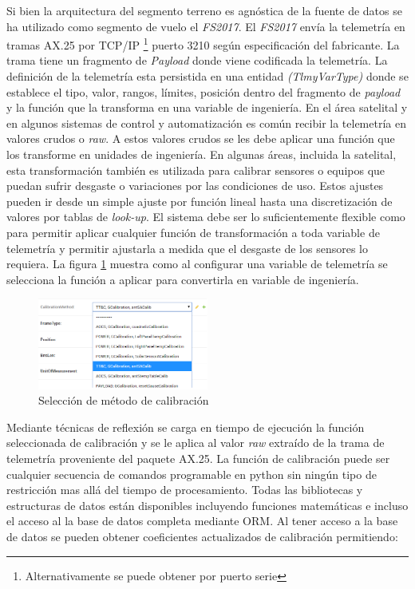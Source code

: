 \documentclass[twoside,twocolumn]{article}
\begin{document}
Si bien la  arquitectura del segmento terreno es agnóstica de la fuente de datos se ha utilizado como segmento de vuelo el \textit{FS2017}. El \textit{FS2017} envía la telemetría en tramas AX.25 por 
TCP/IP \footnote{Alternativamente se puede obtener por puerto serie} puerto 3210 
según especificación del fabricante. La trama tiene un fragmento de 
\textit{Payload} donde viene codificada la telemetría. La definición de la 
telemetría esta persistida en una entidad \textit{(TlmyVarType)} donde se establece 
el tipo, valor, rangos, límites, posición dentro del fragmento de \textit{payload} y la función que 
la transforma en una variable de ingeniería. En el área satelital y en algunos 
sistemas de control y automatización es común recibir la telemetría en valores 
crudos o \textit{raw}. A estos valores crudos se les debe aplicar una función 
que los transforme en unidades de ingeniería. En algunas áreas, incluida la 
satelital,  esta transformación también es utilizada para calibrar sensores o 
equipos que puedan sufrir desgaste o variaciones por las condiciones de uso. 
Estos ajustes pueden ir desde un simple ajuste por función lineal hasta una 
discretización de valores por tablas de \textit{look-up}. El sistema debe ser lo 
suficientemente flexible como para permitir aplicar cualquier función de 
transformación a toda variable de telemetría y permitir ajustarla a medida que 
el desgaste de los sensores lo requiera.
La figura \ref{fig:MetodoCalibracion} muestra como al configurar una variable de telemetría se selecciona la función a aplicar para convertirla en variable de ingeniería.

\begin{figure}[]
  \caption{Selección de método de calibración}
  \label{fig:MetodoCalibracion}
  \centering
  \includegraphics[width=0.5\textwidth]{Imagenes/TTCCalibracionDiscreta.png}
\end{figure}

Mediante técnicas de reflexión se carga en tiempo de ejecución la función seleccionada de calibración y se le aplica al valor \textit{raw} extraído de la trama de telemetría proveniente del paquete AX.25. La función de calibración puede ser cualquier secuencia de comandos programable en python sin ningún tipo de restricción mas allá del tiempo de procesamiento. Todas las bibliotecas y estructuras de datos están disponibles incluyendo funciones matemáticas e incluso el acceso al la base de datos completa mediante ORM.
Al tener acceso a la base de datos se pueden obtener coeficientes actualizados de calibración permitiendo: 
\end{document}
